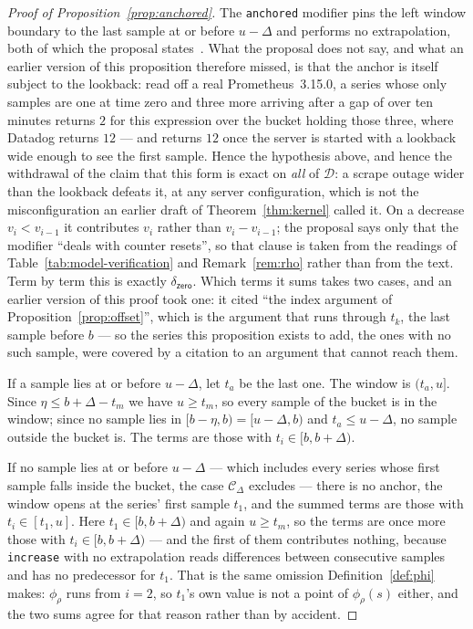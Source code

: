 \begin{proof}[Proof of Proposition~\ref{prop:anchored}]
The \texttt{anchored} modifier pins the left window boundary to the last
sample at or before $u-\Delta$ and performs no extrapolation, both of which the
proposal states~\citep{prom0052}. What the proposal does not say, and what an earlier
version of this proposition therefore missed, is that the anchor is itself subject to the
lookback: read off a real Prometheus~3.15.0, a series whose only samples are one at
time zero and three more arriving after a gap of over ten minutes returns $2$ for this
expression over the bucket holding those three, where Datadog returns $12$ --- and
returns $12$ once the server is started with a lookback wide enough to see the first
sample. Hence the hypothesis above, and hence the withdrawal of the claim that
this form is exact on \emph{all} of $\mathcal{D}$: a scrape outage wider than the
lookback defeats it, at any server configuration, which is not the misconfiguration an
earlier draft of Theorem~\ref{thm:kernel} called it. On a decrease $v_i<v_{i-1}$ it contributes $v_i$
rather than $v_i-v_{i-1}$; the proposal says only that the modifier ``deals with
counter resets'', so that clause is taken from the readings of
Table~\ref{tab:model-verification} and Remark~\ref{rem:rho} rather than from the text. Term by term this is exactly
$\delta_{\mathsf{zero}}$. Which terms it sums takes two cases, and an earlier version of
this proof took one: it cited ``the index argument of Proposition~\ref{prop:offset}'',
which is the argument that runs through $t_k$, the last sample before $b$ --- so the
series this proposition exists to add, the ones with no such sample, were covered by a
citation to an argument that cannot reach them.

If a sample lies at or before $u-\Delta$, let $t_a$ be the last one. The window is
$(t_a,u]$. Since $\eta\le b+\Delta-t_m$ we have $u\ge t_m$, so every sample of the bucket
is in the window; since no sample lies in $[b-\eta,b)=[u-\Delta,b)$ and $t_a\le u-\Delta$,
no sample outside the bucket is. The terms are those with $t_i\in[b,b+\Delta)$.

If no sample lies at or before $u-\Delta$ --- which includes every series whose first
sample falls inside the bucket, the case $\mathcal{C}_\Delta$ excludes --- there is no
anchor, the window opens at the series' first sample $t_1$, and the summed terms are
those with $t_i\in[t_1,u]$. Here $t_1\in[b,b+\Delta)$ and again $u\ge t_m$, so the terms
are once more those with $t_i\in[b,b+\Delta)$ --- and the first of them contributes
nothing, because \texttt{increase} with no extrapolation reads differences between
consecutive samples and has no predecessor for $t_1$. That is the same omission
Definition~\ref{def:phi} makes: $\phi_\rho$ runs from $i=2$, so $t_1$'s own value is not
a point of $\phi_\rho(s)$ either, and the two sums agree for that reason rather than by
accident.


\end{proof}
